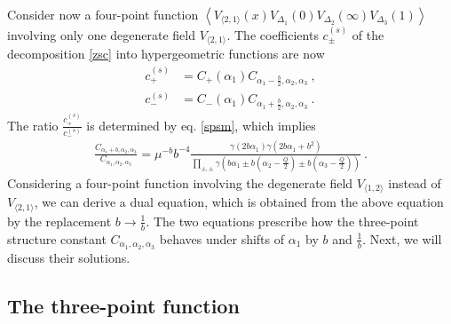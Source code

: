 \documentclass[12pt, a4paper, notitlepage, twoside]{report}
\numberwithin{equation}{section}
\theoremstyle{break}
\begin{document}
Consider now a four-point function $\left\langle V_{\langle 2,1 \rangle}(x)V_{\Delta_1}(0)V_{\Delta_2}(\infty)V_{\Delta_3}(1)\right\rangle$ involving only one degenerate field $V_{\langle 2,1 \rangle}$.
The coefficients $c^{(s)}_\pm$ of the decomposition \eqref{zsc} into hypergeometric functions are now 
\begin{align}
 c_+^{(s)} & = C_+(\alpha_1) C_{\alpha_1-\frac{b}{2},\alpha_2,\alpha_3} \ ,
\\
c_-^{(s)} & = C_-(\alpha_1) C_{\alpha_1+\frac{b}{2},\alpha_2,\alpha_3}\ .
\end{align}
The ratio $\frac{c_+^{(s)}}{c_-^{(s)}}$ is determined by eq. \eqref{spsm}, which implies
\begin{align}
 \frac{C_{\alpha_1+b,\alpha_2,\alpha_3}}{C_{\alpha_1,\alpha_2,\alpha_3}} = \mu^{-b} b^{-4}\frac{\gamma(2b\alpha_1)\gamma(2b\alpha_1+b^2)}{\prod_{\pm,\pm} \gamma\left(b\alpha_1\pm b(\alpha_2-\frac{Q}{2})\pm b(\alpha_3-\frac{Q}{2})\right)}\ .
\label{fcc}
\end{align}
Considering a four-point function involving the degenerate field $V_{\langle 1,2 \rangle}$ instead of $V_{\langle 2,1 \rangle}$, we can derive a dual equation, which is obtained from the above equation by the replacement $b\to \frac{1}{b}$. 
The two equations prescribe how the three-point structure constant $C_{\alpha_1,\alpha_2,\alpha_3}$ behaves under shifts of $\alpha_1$ by $b$ and $\frac{1}{b}$.
Next, we will discuss their solutions.


\subsection{The three-point function \label{sectpf}}
\end{document}
